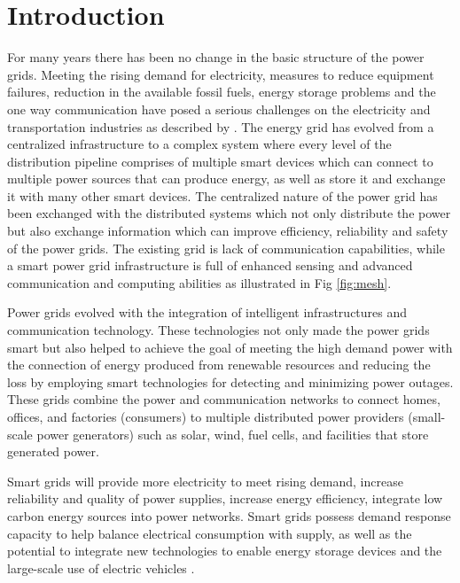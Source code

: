 \chapter{Introduction}
\graphicspath{ {images/} }

\frenchspacing
For many years there has been no change in the basic structure of the power grids. Meeting the rising demand for electricity, measures to reduce equipment failures, reduction in the available fossil fuels, energy storage problems and the one way communication have posed a serious challenges on the electricity and transportation industries as described by  \cite{gungor2011smart}.  The energy grid has evolved from a centralized infrastructure to a complex system where every level of the distribution pipeline comprises of multiple smart devices which can connect to multiple power sources that can produce energy, as well as store it and exchange it with many other smart devices. The centralized nature of the power grid has been exchanged with the distributed systems which not only distribute the power but also exchange information which can improve efficiency, reliability and safety of the power grids. The existing grid is lack of communication capabilities, while a smart power grid infrastructure is full of enhanced sensing and advanced communication and computing abilities as illustrated in Fig \ref{fig:mesh}.

Power grids evolved with the integration of intelligent infrastructures and communication technology. These technologies not only made the power grids smart but also helped to achieve the goal of meeting the high demand power with the connection of energy produced from renewable resources and reducing the loss by employing smart technologies for detecting and minimizing power outages. These grids combine the  power and communication networks to connect homes, offices, and factories (consumers) to multiple distributed power providers (small-scale power generators) such as solar, wind, fuel cells, and facilities that store generated power. 

Smart grids will provide more electricity to meet rising demand, increase reliability and quality of power supplies, increase energy efficiency, integrate low carbon energy sources into power networks. Smart grids possess demand response capacity to help balance electrical consumption with supply, as well as the potential to integrate new technologies to enable energy storage devices and the large-scale use of electric vehicles \cite{abb}. 

